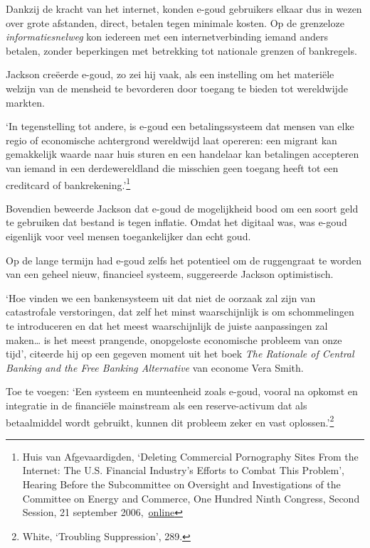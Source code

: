 \documentclass[
  a5paper,
  smalldemyvopaper,11pt,twoside,onecolumn,openright,extrafontsizes]{memoir}
\begin{document}
Dankzij de kracht van het internet, konden e-goud gebruikers elkaar dus
in wezen over grote afstanden, direct, betalen tegen minimale kosten. Op
de grenzeloze \emph{informatiesnelweg} kon iedereen met een
internetverbinding iemand anders betalen, zonder beperkingen met
betrekking tot nationale grenzen of bankregels.

Jackson creëerde e-goud, zo zei hij vaak, als een instelling om het
materiële welzijn van de mensheid te bevorderen door toegang te bieden
tot wereldwijde markten.

`In tegenstelling tot andere, is e-goud een betalingssysteem dat mensen
van elke regio of economische achtergrond wereldwijd laat opereren: een
migrant kan gemakkelijk waarde naar huis sturen en een handelaar kan
betalingen accepteren van iemand in een derdewereldland die misschien
geen toegang heeft tot een creditcard of bankrekening.'\footnote{Huis
  van Afgevaardigden, `Deleting Commercial Pornography Sites From the
  Internet: The U.S. Financial Industry's Efforts to Combat This
  Problem', Hearing Before the Subcommittee on Oversight and
  Investigations of the Committee on Energy and Commerce, One Hundred
  Ninth Congress, Second Session, 21 september
  2006,~\href{https://www.govinfo.gov/content/pkg/CHRG-109hhrg31467/html/CHRG-109hhrg31467.htm}{online}}

Bovendien beweerde Jackson dat e-goud de mogelijkheid bood om een soort
geld te gebruiken dat bestand is tegen inflatie. Omdat het digitaal was,
was e-goud eigenlijk voor veel mensen toegankelijker dan echt goud.

Op de lange termijn had e-goud zelfs het potentieel om de ruggengraat te
worden van een geheel nieuw, financieel systeem, suggereerde Jackson
optimistisch.

`Hoe vinden we een bankensysteem uit dat niet de oorzaak zal zijn van
catastrofale verstoringen, dat zelf het minst waarschijnlijk is om
schommelingen te introduceren en dat het meest waarschijnlijk de juiste
aanpassingen zal maken\ldots{} is het meest prangende, onopgeloste
economische probleem van onze tijd', citeerde hij op een gegeven moment
uit het boek \emph{The Rationale of Central Banking and the Free Banking
Alternative} van econome Vera Smith.

Toe te voegen: `Een systeem en munteenheid zoals e-goud, vooral na
opkomst en integratie in de financiële mainstream als een
reserve-activum dat als betaalmiddel wordt gebruikt, kunnen dit probleem
zeker en vast oplossen.'\footnote{\hspace{0pt}White, `Troubling
  Suppression', 289.}
\end{document}
